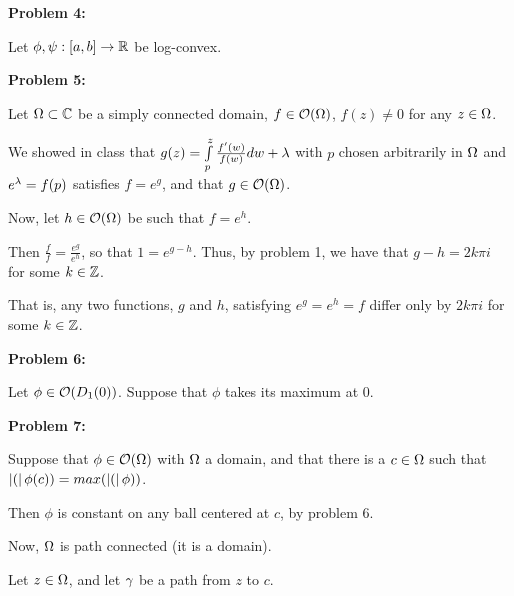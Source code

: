 \documentclass[a4paper,12pt]{article}
\begin{document}
{\bf Problem 4:}

Let $\phi, \psi : [a,b] \to \mathbb{R}$ be log-convex.


\shunt

{\bf Problem 5:}

Let $\Omega \subset \mathbb{C}$ be a simply connected domain, $f \in \mathcal{O}(\Omega)$, $f(z) \neq 0$ for any $z \in \Omega$.

We showed in class that $g(z) = \int\limits_p^z \frac{f'(w)}{f(w)} dw + \lambda$ with $p$ chosen arbitrarily in $\Omega$ and $e^\lambda = f(p)$ satisfies $f=e^g$, and that $g \in \mathcal{O}(\Omega)$. 

Now, let $h \in \mathcal{O}(\Omega)$ be such that $f=e^h$.

Then $\frac{f}{f} = \frac{e^g}{e^h}$, so that $1 = e^{g-h}$. Thus, by problem 1, we have that $g-h = 2k \pi  i$ for some $k \in \mathbb{Z}$. %

That is, any two functions, $g$ and $h$, satisfying $e^g=e^h=f$ differ only by $2k\pi i $ for some $k \in \mathbb{Z}$.

\shunt

{\bf Problem 6:}

Let $\phi \in \mathcal{O}(D_1(0))$. Suppose that $\phi$ takes its maximum at $0$.


\shunt

{\bf Problem 7:}

Suppose that $\phi \in \mathcal{O}(\Omega)$ with $\Omega$ a domain, and that there is a $c \in \Omega$ such that $\left\lvert ( \right\rvert\phi(c)) = max(\left\lvert ( \right\rvert\phi))$.

Then $\phi$ is constant on any ball centered at $c$, by problem 6. %

Now, $\Omega$ is path connected (it is a domain).

Let $z \in \Omega$, and let $\gamma$ be a path from $z$ to $c$. %

\shunt
\end{document}
